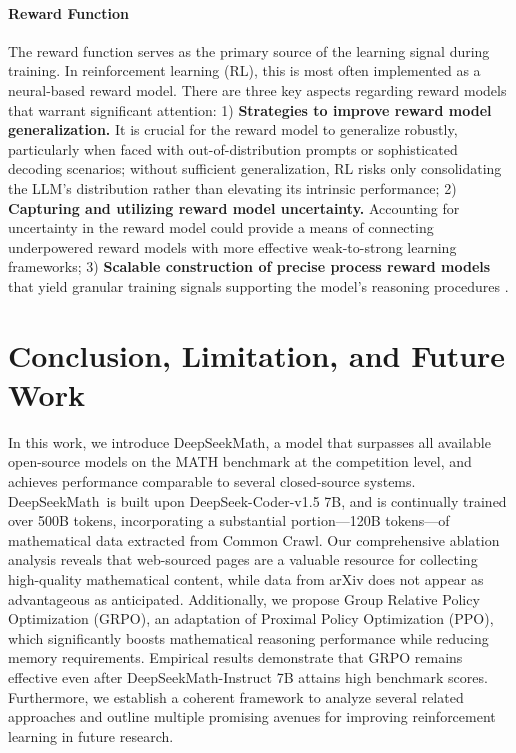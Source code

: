 \begin{itemize}[topsep=0pt]
\begin{itemize}[topsep=0pt]
\paragraph{Reward Function} The reward function serves as the primary source of the learning signal during training. In reinforcement learning (RL), this is most often implemented as a neural-based reward model. There are three key aspects regarding reward models that warrant significant attention: 1) \textbf{Strategies to improve reward model generalization.} It is crucial for the reward model to generalize robustly, particularly when faced with out-of-distribution prompts or sophisticated decoding scenarios; without sufficient generalization, RL risks only consolidating the LLM’s distribution rather than elevating its intrinsic performance; 2) \textbf{Capturing and utilizing reward model uncertainty.} Accounting for uncertainty in the reward model could provide a means of connecting underpowered reward models with more effective weak-to-strong learning frameworks; 3) \textbf{Scalable construction of precise process reward models} that yield granular training signals supporting the model’s reasoning procedures \citep{lightman2023let,wang2023math}.

\section{Conclusion, Limitation, and Future Work} In this work, we introduce DeepSeekMath, a model that surpasses all available open-source models on the MATH benchmark at the competition level, and achieves performance comparable to several closed-source systems. DeepSeekMath~is built upon DeepSeek-Coder-v1.5 7B, and is continually trained over 500B tokens, incorporating a substantial portion—120B tokens—of mathematical data extracted from Common Crawl. Our comprehensive ablation analysis reveals that web-sourced pages are a valuable resource for collecting high-quality mathematical content, while data from arXiv does not appear as advantageous as anticipated. Additionally, we propose Group Relative Policy Optimization (GRPO), an adaptation of Proximal Policy Optimization (PPO), which significantly boosts mathematical reasoning performance while reducing memory requirements. Empirical results demonstrate that GRPO remains effective even after DeepSeekMath-Instruct 7B attains high benchmark scores. Furthermore, we establish a coherent framework to analyze several related approaches and outline multiple promising avenues for improving reinforcement learning in future research.


\end{itemize}
\end{itemize}
